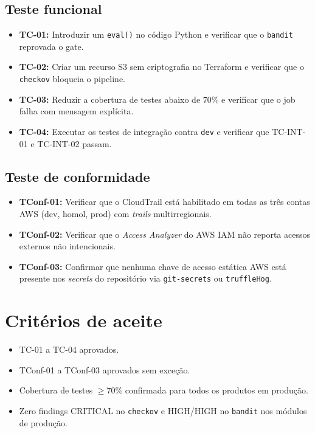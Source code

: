 \subsection{Teste funcional}

\begin{itemize}[leftmargin=*]
  \item \textbf{TC-01:} Introduzir um \texttt{eval()} no c\'odigo
        Python e verificar que o \texttt{bandit} reprovada o gate.
  \item \textbf{TC-02:} Criar um recurso S3 sem criptografia no
        Terraform e verificar que o \texttt{checkov} bloqueia o pipeline.
  \item \textbf{TC-03:} Reduzir a cobertura de testes abaixo de 70\%
        e verificar que o job falha com mensagem expl\'icita.
  \item \textbf{TC-04:} Executar os testes de integra\c{c}\~ao contra
        \texttt{dev} e verificar que TC-INT-01 e TC-INT-02 passam.
\end{itemize}

\subsection{Teste de conformidade}

\begin{itemize}[leftmargin=*]
  \item \textbf{TConf-01:} Verificar que o CloudTrail est\'a habilitado
        em todas as tr\^es contas AWS (dev, homol, prod) com \textit{trails}
        multirregionais.
  \item \textbf{TConf-02:} Verificar que o \textit{Access Analyzer} do
        AWS IAM n\~ao reporta acessos externos n\~ao intencionais.
  \item \textbf{TConf-03:} Confirmar que nenhuma chave de acesso est\'atica
        AWS est\'a presente nos \textit{secrets} do reposit\'orio via
        \texttt{git-secrets} ou \texttt{truffleHog}.
\end{itemize}

\section{Crit\'erios de aceite}

\begin{itemize}[leftmargin=*]
  \item TC-01 a TC-04 aprovados.
  \item TConf-01 a TConf-03 aprovados sem exce\c{c}\~ao.
  \item Cobertura de testes $\geq 70\%$ confirmada para todos os
        produtos em produ\c{c}\~ao.
  \item Zero findings CRITICAL no \texttt{checkov} e HIGH/HIGH no
        \texttt{bandit} nos m\'odulos de produ\c{c}\~ao.
\end{itemize}

